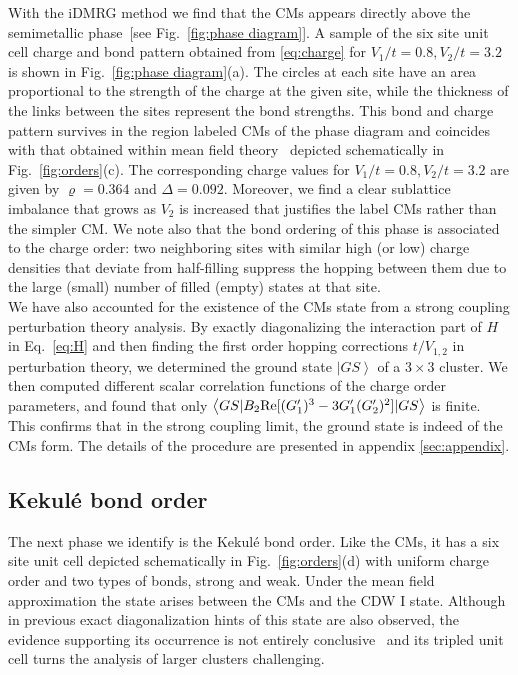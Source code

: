 \documentclass[aps,prx,10pt,twocolumn,floatfix,superscriptaddress,showpacs,numerical,footinbib]{revtex4-1}
\begin{document}
%
With the iDMRG method we find that the CMs appears directly above the semimetallic phase~[see Fig.~\ref{fig:phase diagram}].
%
A sample of the six site unit cell charge and bond pattern obtained from \eqref{eq:charge} for $V_1/t = 0.8, V_2/t = 3.2 $ is shown in Fig.~\ref{fig:phase diagram}(a).
%
The circles at each site have an area proportional to the strength of the charge at the given site, while the thickness of the links between the sites represent the bond strengths.
%
This bond and charge pattern survives in the region labeled CMs of the phase diagram and coincides with that obtained within mean field theory~\cite{GCC13} depicted schematically in Fig.~\ref{fig:orders}(c).
%
The corresponding charge values for $V_1/t = 0.8, V_2/t = 3.2 $ are given by $\varrho=0.364$ and $\Delta = 0.092$.
%
Moreover, we find a clear sublattice imbalance that grows as $V_{2}$ is increased that justifies the label CMs rather than the simpler CM.
%
We note also that the bond ordering of this phase is associated to the charge order: two neighboring sites with similar high (or low) charge densities
that deviate from half-filling suppress the hopping between them due to the large (small) number of filled (empty) states at that site. 
\\
% 
We have also accounted for the existence of the CMs state from a strong coupling perturbation theory analysis. 
%
By exactly diagonalizing the interaction part of $H$ in Eq.~\eqref{eq:H} and then finding the first order hopping corrections $t/V_{1,2}$ in perturbation theory, 
we determined the ground state $\left.|GS\right>$ of a $3\times3$ cluster. 
%
We then computed different scalar correlation functions of the charge order parameters, and found that only $\left<GS|B_2 {\rm Re}[(G_1')^3-3G_1'(G_2')^2]|GS\right>$ is finite. 
%
This confirms that in the strong coupling limit, the ground state is indeed of the CMs form. The details of the procedure are presented in appendix \ref{sec:appendix}. 
%

\subsection{Kekul\'{e} bond order}
%
The next phase we identify is the Kekul\'{e}
bond order.
%
Like the CMs, it has a six site unit cell depicted schematically in Fig.~\ref{fig:orders}(d)
with uniform charge order and two types of bonds, strong and weak.
%
Under the mean field approximation the state arises between the CMs and the CDW I state.
%
Although in previous exact diagonalization hints of this state are also observed,
the evidence supporting its occurrence is not entirely conclusive~\cite{GGNVC13} and
its tripled unit cell turns the analysis of larger clusters challenging.
%
\end{document}

